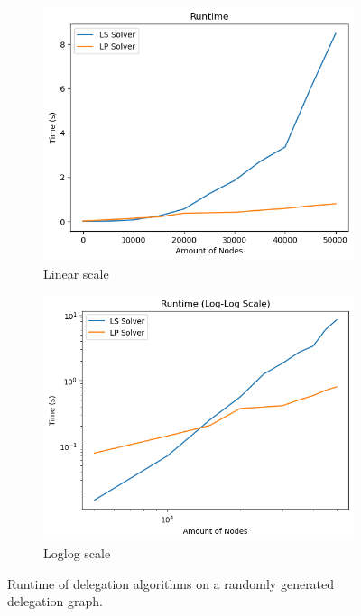 \begin{figure}[h]
    \centering
    \begin{subfigure}[t]{0.45\textwidth}
        \centering
        \includegraphics[width=\textwidth]{0-50000_random_no_iterative}
        \caption{Linear scale}
         \label{subfig:random-large-no-iterative-linear}
    \end{subfigure}
    \hfill
    \begin{subfigure}[t]{0.45\textwidth}
        \centering
        \includegraphics[width=\textwidth]{0-50000_random_no_iterative_loglog}
        \caption{Loglog scale}
         \label{subfig:random-large-no-iterative-loglog}
    \end{subfigure}
    \caption{Runtime of delegation algorithms on a randomly generated delegation graph.}
    \label{fig:random-large-no-iterative}
\end{figure}

